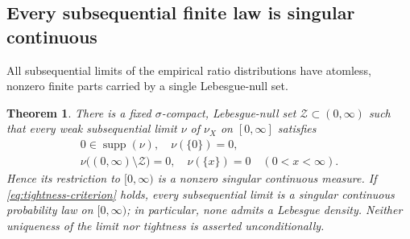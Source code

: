 \documentclass[11pt,letterpaper,reqno]{amsart}
\numberwithin{equation}{section}
\newtheorem{theorem}{Theorem}[section]
\theoremstyle{remark}
\newcommand{\1}{\mathbf 1}
\begin{document}
\subsection{Every subsequential finite law is singular continuous}

All subsequential limits of the empirical ratio distributions have atomless, nonzero finite parts carried by a single Lebesgue-null set.

\begin{theorem}
\label{thm:dadd:universal-singularity}
There is a fixed $\sigma$-compact, Lebesgue-null set
$\mathcal{Z}\subset(0,\infty)$ such that every weak subsequential
limit $\nu$ of $\nu_X$ on $[0,\infty]$ satisfies
\begin{gather*}
 0\in\operatorname{supp}(\nu),\quad \nu(\{0\})=0,\\
 \nu\bigl((0,\infty)\setminus\mathcal{Z}\bigr)=0,\quad
 \nu(\{x\})=0\quad(0<x<\infty).
\end{gather*}
Hence its restriction to $[0,\infty)$ is a nonzero singular
continuous measure. If \eqref{eq:tightness-criterion} holds, every
subsequential limit is a singular continuous probability law on
$[0,\infty)$; in particular, none admits a Lebesgue density.
Neither uniqueness of the limit nor tightness is asserted
unconditionally.
\end{theorem}
\end{document}
